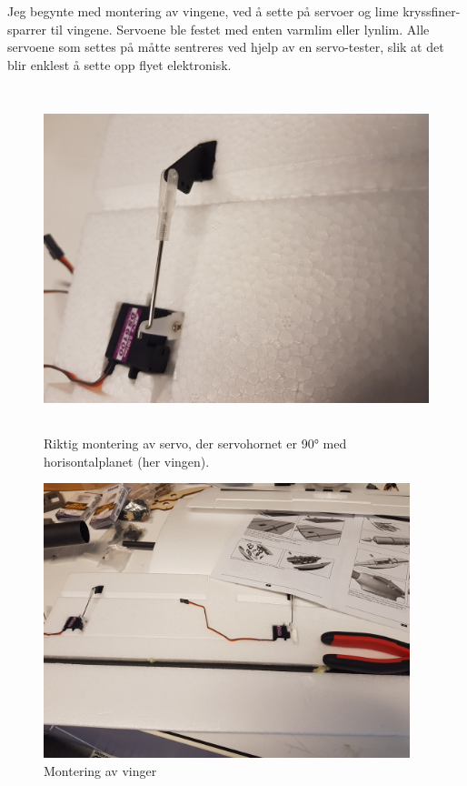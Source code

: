 \documentclass[12pt, a4paper]{report}
\begin{document}
Jeg begynte med montering av vingene, ved å sette på servoer og lime kryssfiner-sparrer til vingene. Servoene ble festet med enten varmlim eller lynlim. Alle servoene som settes på måtte sentreres ved hjelp av en servo-tester, slik at det blir enklest å sette opp flyet elektronisk. 

\begin{figure}[ht]
	\centering
	\includegraphics[height = 10cm, width = .6\textwidth]{bilder/servomontering.jpg}
	\caption{Riktig montering av servo, der servohornet er \ang{90} med horisontalplanet (her vingen).}
\end{figure}


\begin{figure}[ht]
	\centering
	\includegraphics[width=.6\textwidth,  height = 8cm]{bilder/vingemontering.jpg}
	\caption{Montering av vinger}
\end{figure}
\end{document}
